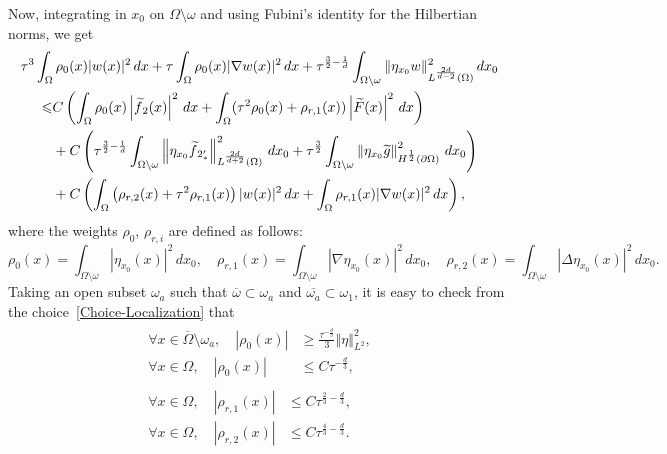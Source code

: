\documentclass[AHL,Unicode,longabstracts]{cedram}
\newcommand{\norm}[1]{\left\Vert#1\right\Vert}
\renewcommand{\leq}{\leqslant}
\renewcommand{\geq}{\geqslant}
\renewcommand{\tilde}{\widetilde}
\let\oldtilde\tilde
\renewcommand*{\tilde}[1]{\mathchoice{\widetilde{#1}}{\widetilde{#1}}{\oldtilde{#1}}{\oldtilde{#1}}}
\let\oldforall\forall
\renewcommand*{\forall}{\mathrel{\oldforall}}
\begin{document}
Now, integrating in $x_0$ on $\Omega \setminus \omega$ and using Fubini's identity for the Hilbertian norms, we get
\begin{multline*}
\tau^3 \int_\Omega \rho_0(x) |w(x)|^2 \, dx +
\tau \int_\Omega \rho_0(x) |\nabla w(x)|^2 \, dx +
\tau^{\frac{3}{2}-\frac{1}{d}} \int_{\Omega \setminus \omega} \| \eta_{x_0} w \|_{L^{\frac{2d}{d-2}}(\Omega)}^2 \, dx_0
\\
\begin{aligned}
\leq&
C\left(
\int_\Omega \rho_0(x) \left|\tilde f_2(x)\right|^2\, dx +
\int_\Omega (\tau^2 \rho_0(x) + \rho_{r,1}(x)) \left|\tilde F(x)\right|^2\, dx
\right)
\\
&+ C
\left(
\tau^{\frac{3}{2}-\frac{1}{d}} \int_{\Omega \setminus \omega} \norm{\eta_{x_0} \tilde f_{2_*'} }_{L^{\frac{2d}{d+2}}(\Omega)}^2 \, dx_0 +
\tau^{\frac{3}{2}} \int_{\Omega \setminus \omega} \norm{ \eta_{x_0} \tilde g}_{H^{\frac{1}{2}}(\partial \Omega)}^2 \, dx_0
\right)
\\
& + C
\left(
\int_\Omega \left(\rho_{r,2}(x) + \tau^2 \rho_{r,1}(x)\right) |w(x)|^2 \, dx +
\int_\Omega \rho_{r,1}(x) |\nabla w(x)|^2 \, dx
\right),
\end{aligned}
\end{multline*}
where the weights $\rho_0$, $\rho_{r,i}$ are defined as follows:
\begin{equation*}
\rho_0(x) \!= \!\int_{\Omega \setminus \omega} \!\!\! |\eta_{x_0}(x)|^2 \, dx_0, \quad
\rho_{r,1}(x) \! =\! \int_{\Omega \setminus \omega} \!\!\!|\nabla \eta_{x_0}(x)|^2 \, dx_0,
\quad
\rho_{r,2}(x) \! = \!\int_{\Omega \setminus \omega}\!\!\! |\Delta \eta_{x_0}(x)|^2 \, dx_0.
\end{equation*}
Taking an open subset $\omega_a$ such that $\overline\omega \subset \omega_a$ and $\overline{\omega_a} \subset \omega_1$, it is easy to check from the choice~\eqref{Choice-Localization} that
\begin{align}
\begin{aligned}\label{Est-rho-0-above}
\forall x \in \overline{\Omega} \setminus \omega_a,\quad  |\rho_0(x) | &\geq \frac{\tau^{-\frac{d}{3}}}{3} \norm{\eta}_{L^2}^2,
\\
\forall x \in \Omega, \quad  |\rho_{0}(x)| &\leq C \tau^{- \frac{d}{3}},
\end{aligned}
\\
\begin{aligned}\label{Est-rho-2-above}
\forall x \in \Omega, \quad  |\rho_{r,1}(x)| &\leq C \tau^{\frac{2}{3} - \frac{d}{3}},
\\
\forall x \in \Omega, \quad  |\rho_{r,2}(x)| &\leq C \tau^{\frac{4}{3} - \frac{d}{3}}.
\end{aligned}
\end{align}
\end{document}
